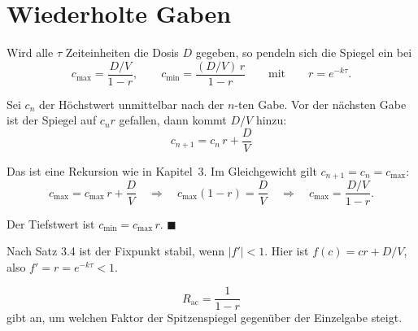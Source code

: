 \section{Wiederholte Gaben}

\begin{merksatz}
Wird alle $\tau$ Zeiteinheiten die Dosis $D$ gegeben, so pendeln sich die Spiegel ein bei
\[ c_{\max} = \frac{D/V}{1-r}, \qquad c_{\min} = \frac{(D/V)\,r}{1-r} \qquad\text{mit}\qquad r = e^{-k\tau} . \]

Sei $c_n$ der Höchstwert unmittelbar nach der $n$-ten Gabe. Vor der nächsten Gabe ist der Spiegel auf $c_n r$ gefallen, dann kommt $D/V$ hinzu:
\[ c_{n+1} = c_n\,r + \frac{D}{V} \]

Das ist eine Rekursion wie in Kapitel~3. Im Gleichgewicht gilt $c_{n+1} = c_n = c_{\max}$:
\[ c_{\max} = c_{\max}\,r + \frac{D}{V} \quad\Longrightarrow\quad c_{\max}(1-r) = \frac{D}{V} \quad\Longrightarrow\quad c_{\max} = \frac{D/V}{1-r} . \]

Der Tiefstwert ist $c_{\min} = c_{\max}\,r$. $\blacksquare$

Nach Satz 3.4 ist der Fixpunkt stabil, wenn $|f'| < 1$. Hier ist $f(c) = cr + D/V$, also $f' = r = e^{-k\tau} < 1$. \checkmark

\[ R_{\text{ac}} = \frac{1}{1-r} \]
gibt an, um welchen Faktor der Spitzenspiegel gegenüber der Einzelgabe steigt.
\end{merksatz}

